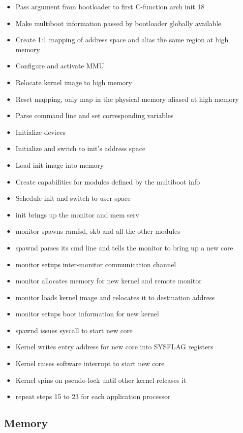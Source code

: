 \documentclass[a4paper,twoside]{report} %
\begin{document}
\begin{itemize}
\item Pass argument from bootloader to first C-function arch
  init 18
\item Make multiboot information passed by bootloader globally
  available
\item Create 1:1 mapping of address space and alias the same region at
  high memory
\item Configure and activate MMU
\item Relocate kernel image to high memory
\item Reset mapping, only map in the physical memory aliased at high
  memory
\item Parse command line and set corresponding variables
\item Initialize devices
\item Initialize and switch to init’s address space
\item Load init image into memory
\item Create capabilities for modules defined by the multiboot info
\item Schedule init and switch to user space
\item init brings up the monitor and mem serv
\item monitor spawns ramfsd, skb and all the other modules
\item spawnd parses its cmd line and tells the monitor to bring up a
  new core
\item monitor setups inter-monitor communication channel
\item monitor allocates memory for new kernel and remote monitor
\item monitor loads kernel image and relocates it to destination
  address
\item monitor setups boot information for new kernel
\item spawnd issues syscall to start new core
\item Kernel writes entry address for new core into SYSFLAG registers
\item Kernel raises software interrupt to start new core
\item Kernel spins on pseudo-lock until other kernel releases it
\item repeat steps 15 to 23 for each application processor
\end{itemize}

\subsection{Memory}
\end{document}
